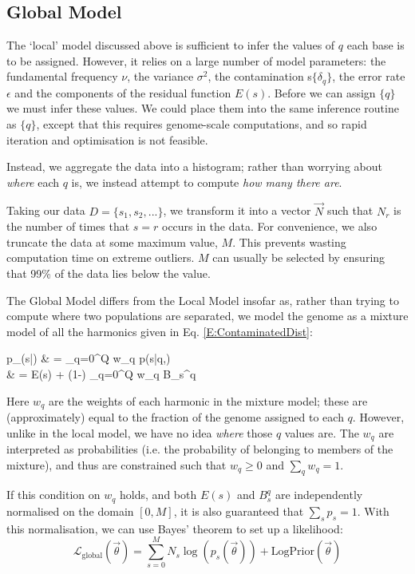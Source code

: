 \documentclass[fleqn,usenatbib]{mnras}
\newcommand{\eref}[1]{Eq. \eqref{#1}}
\begin{document}
{{				\subsection{Global Model}\label{A:Global}

					The `local' model discussed above is sufficient to infer the values of $q$ each base is to be assigned. However, it relies on a large number of  model parameters: the fundamental frequency $\nu$, the variance $\sigma^2$, the contamination s$\{\delta_q\}$, the error rate $\epsilon$ and the components of the residual function $E(s)$. Before we can assign $\{q\}$ we must infer these values. We could place them into the same inference routine as $\{q\}$, except that this requires genome-scale computations, and so rapid iteration and optimisation is not feasible. 

					Instead, we aggregate the data into a histogram; rather than worrying about \textit{where} each $q$ is, we instead attempt to compute \textit{how many there are}.

					Taking our data $D = \{s_1, s_2, ...\}$, we transform it into a vector $\vec{N}$ such that $N_r$ is the number of times that $s = r$ occurs in the data. For convenience, we also truncate the data at some maximum value, $M$. This prevents wasting computation time on extreme outliers. $M$ can usually be selected by ensuring that 99\% of the data lies below the value.

					The Global Model differs from the Local Model insofar as, rather than trying to compute where two populations are separated, we model the genome as a mixture model of all the harmonics given in \eref{E:ContaminatedDist}:
					\begin{spalign}
						p_(s|\vec{\theta}) & = \sum_{q=0}^Q w_q p(s|q,\vec{\theta}) 
						\\
						& = \epsilon E(s) + (1-\epsilon) \sum_{q=0}^Q w_q B_s^q \label{E:DefinePGlobal}
					\end{spalign}
					Here $w_q$ are the weights of each harmonic in the mixture model; these are (approximately) equal to the fraction of the genome assigned to each $q$. However, unlike in the local model, we have no idea \textit{where} those $q$ values are. The $w_q$ are interpreted as probabilities (i.e. the probability of belonging to members of the mixture), and thus are constrained such that $w_q \geq 0$ and $\sum_q w_q = 1$.

					If this condition on $w_q$ holds, and both $E(s)$ and $B_s^q$ are independently normalised on the domain $[0,M]$, it is also guaranteed that $\sum_s p_s = 1$. With this normalisation, we can use Bayes' theorem to set up a likelihood:
					\begin{equation}
						\mathcal{L}_\text{global}(\vec{\theta}) = \sum_{s=0}^M N_s \log\left({p}_s(\vec{\theta})\right) + \text{LogPrior}(\vec{\theta})
					\end{equation}
					
}}
\end{document}
